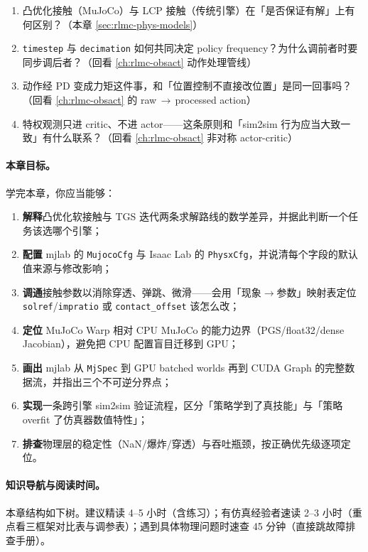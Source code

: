 \begin{practice}
\begin{enumerate}
  \item 凸优化接触（MuJoCo）与 LCP 接触（传统引擎）在「是否保证有解」上有何区别？（本章 \cref{sec:rlmc-phys-models}）
  \item \verb|timestep| 与 \verb|decimation| 如何共同决定 policy frequency？为什么调前者时要同步调后者？（回看 \cref{ch:rlmc-obsact} 动作处理管线）
  \item 动作经 PD 变成力矩这件事，和「位置控制不直接改位置」是同一回事吗？（回看 \cref{ch:rlmc-obsact} 的 raw\,$\to$\,processed action）
  \item 特权观测只进 critic、不进 actor——这条原则和「sim2sim 行为应当大致一致」有什么联系？（回看 \cref{ch:rlmc-obsact} 非对称 actor-critic）
\end{enumerate}
\end{practice}

\paragraph{本章目标。}学完本章，你应当能够：
\begin{enumerate}
  \item \textbf{解释}凸优化软接触与 TGS 迭代两条求解路线的数学差异，并据此判断一个任务该选哪个引擎；
  \item \textbf{配置} mjlab 的 \verb|MujocoCfg| 与 Isaac Lab 的 \verb|PhysxCfg|，并说清每个字段的默认值来源与修改影响；
  \item \textbf{调通}接触参数以消除穿透、弹跳、微滑——会用「现象$\to$参数」映射表定位 \verb|solref|/\verb|impratio| 或 \verb|contact_offset| 该怎么改；
  \item \textbf{定位} MuJoCo Warp 相对 CPU MuJoCo 的能力边界（PGS/float32/dense Jacobian），避免把 CPU 配置盲目迁移到 GPU；
  \item \textbf{画出} mjlab 从 \verb|MjSpec| 到 GPU batched worlds 再到 CUDA Graph 的完整数据流，并指出三个不可逆分界点；
  \item \textbf{实现}一条跨引擎 sim2sim 验证流程，区分「策略学到了真技能」与「策略 overfit 了仿真器数值特性」；
  \item \textbf{排查}物理层的稳定性（NaN/爆炸/穿透）与吞吐瓶颈，按正确优先级逐项定位。
\end{enumerate}

\paragraph{知识导航与阅读时间。}本章结构如下树。建议精读 4--5 小时（含练习）；有仿真经验者速读 2--3 小时（重点看三框架对比表与调参表）；遇到具体物理问题时速查 45 分钟（直接跳故障排查手册）。


